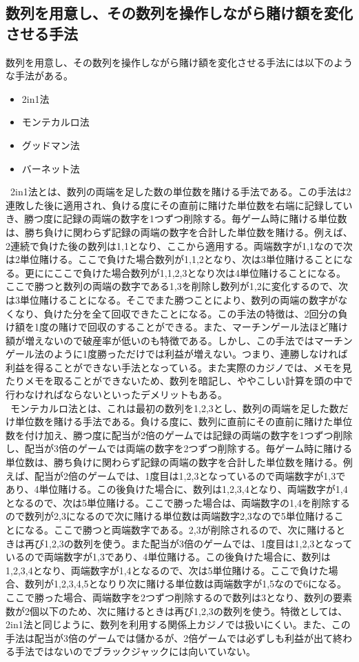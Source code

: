 \subsection{数列を用意し、その数列を操作しながら賭け額を変化させる手法}
 数列を用意し、その数列を操作しながら賭け額を変化させる手法には以下のような手法がある。
  \begin{itemize}
 \item 2in1法
 \item モンテカルロ法
 \item グッドマン法
 \item バーネット法
 \end{itemize}
\ 2in1法とは、数列の両端を足した数の単位数を賭ける手法である。この手法は2連敗した後に適用され、負ける度にその直前に賭けた単位数を右端に記録していき、勝つ度に記録の両端の数字を1つずつ削除する。毎ゲーム時に賭ける単位数は、勝ち負けに関わらず記録の両端の数字を合計した単位数を賭ける。例えば、2連続で負けた後の数列は{1,1}となり、ここから適用する。両端数字が1,1なので次は2単位賭ける。ここで負けた場合数列が{1,1,2}となり、次は3単位賭けることになる。更ににここで負けた場合数列が{1,1,2,3}となり次は4単位賭けることになる。ここで勝つと数列の両端の数字である1,3を削除し数列が{1,2}に変化するので、次は3単位賭けることになる。そこでまた勝つことにより、数列の両端の数字がなくなり、負けた分を全て回収できたことになる。この手法の特徴は、2回分の負け額を1度の賭けで回収のすることができる。また、マーチンゲール法ほど賭け額が増えないので破産率が低いのも特徴である。しかし、この手法ではマーチンゲール法のように1度勝っただけでは利益が増えない。つまり、連勝しなければ利益を得ることができない手法となっている。また実際のカジノでは、メモを見たりメモを取ることができないため、数列を暗記し、ややこしい計算を頭の中で行わなければならないといったデメリットもある。\\
\ モンテカルロ法とは、これは最初の数列を{1,2,3}とし、数列の両端を足した数だけ単位数を賭ける手法である。負ける度に、数列に直前にその直前に賭けた単位数を付け加え、勝つ度に配当が2倍のゲームでは記録の両端の数字を1つずつ削除し、配当が3倍のゲームでは両端の数字を2つずつ削除する。毎ゲーム時に賭ける単位数は、勝ち負けに関わらず記録の両端の数字を合計した単位数を賭ける。例えば、配当が2倍のゲームでは、1度目は{1,2,3}となっているので両端数字が1,3であり、4単位賭ける。この後負けた場合に、数列は{1,2,3,4}となり、両端数字が1,4となるので、次は5単位賭ける。ここで勝った場合は、両端数字の1,4を削除するので数列が{2,3}になるので次に賭ける単位数は両端数字2,3なので5単位賭けることになる。ここで勝つと両端数字である。2,3が削除されるので、次に賭けるときは再び{1,2,3}の数列を使う。また配当が3倍のゲームでは、1度目は{1,2,3}となっているので両端数字が1,3であり、4単位賭ける。この後負けた場合に、数列は{1,2,3,4}となり、両端数字が1,4となるので、次は5単位賭ける。ここで負けた場合、数列が{1,2,3,4,5}となりり次に賭ける単位数は両端数字が{1,5}なので6になる。ここで勝った場合、両端数字を2つずつ削除するので数列は{3}となり、数列の要素数が2個以下のため、次に賭けるときは再び{1,2,3}の数列を使う。特徴としては、2in1法と同じように、数列を利用する関係上カジノでは扱いにくい。また、この手法は配当が3倍のゲームでは儲かるが、2倍ゲームでは必ずしも利益が出て終わる手法ではないのでブラックジャックには向いていない。\\
